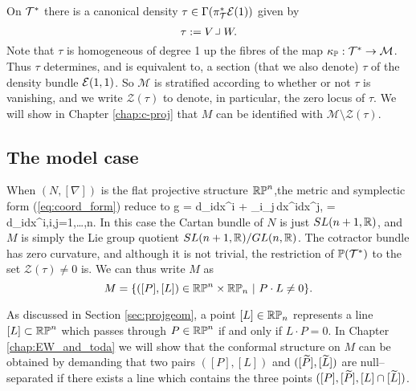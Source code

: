 On $\mathcal{T}^*$ there is  a canonical density $\tau\in \Gamma(\pi_{\mathcal{T}}^*\mathcal{E}(1))$ given by
$$
\tau:= V\hook W .
$$
Note that $\tau$ is homogeneous of degree 1 up the fibres of the
map $\kappa_{\mathbb{P}}:\mathcal{T}^*\to \mathcal{M}$. Thus $\tau$ determines, and is equivalent
to, a section (that we also denote) $\tau$ of the density bundle $\mathcal{E}(1,1)$. So $\mathcal{M}$ is stratified according to
whether or not $\tau$ is vanishing, and we write $\mathcal{Z}(\tau)$
to denote, in particular, the zero locus of $\tau$. We will show in Chapter \ref{chap:c-proj} that $M$ can be identified with $\mathcal{M}\setminus \mathcal{Z}(\tau)$.



\subsection{The model case} \label{sec:intro_model}
When $(N,[\nabla])$ is the flat projective structure $\mathbb{RP}^n$,the metric and symplectic form (\ref{eq:coord_form}) reduce to
\be \label{eq:intro_model_g}
g = d\zeta_i\odot dx^i + \zeta_i\zeta_j\,dx^i\odot dx^j, \quad \Omega = d\zeta_i\wedge dx^i,\quad i,j=1,\dots,n.
\ee
In this case the Cartan bundle of $N$ is just $SL(n+1,\mathbb{R})$, and $M$ is simply the Lie group quotient $SL(n+1,\mathbb{R})/GL(n,\mathbb{R})$. The cotractor bundle has zero curvature, and although it is not trivial, the restriction of $\mathbb{P}(\mathcal{T}^*)$ to the set $\mathcal{Z}(\tau)\neq 0$ is. %
We can thus write $M$ as
\[
M=\{([P],[L])\in\RP^n\times\RP_n\ |\ P\cdot L\neq 0\}.
\]

As discussed in Section \ref{sec:projgeom}, a point $[L]\in\mathbb{RP}_n$ represents a line $[L]\subset\mathbb{RP}^n$ which passes through $P\in\mathbb{RP}^n$ if and only if $L\cdot P=0$. In Chapter \ref{chap:EW_and_toda} we will show that the conformal structure on $M$ can be obtained by demanding that two pairs $([P], [L])$ and $([\widetilde{P}], [\widetilde{L}])$ are null--separated if there exists a line which contains the three points $([P], [\widetilde{P}], [L]\cap [\widetilde{L}])$.

